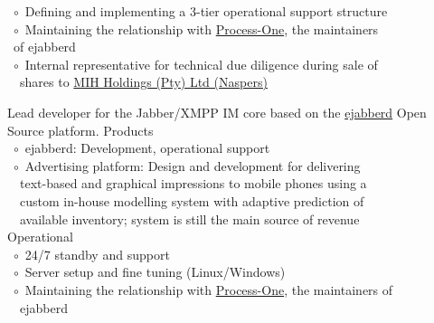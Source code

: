 \documentclass[10pt,a4paper,final]{columncv}
\begin{document}
\begin{cvenv}
{           ~$\circ$~Defining and implementing a 3-tier operational support structure \\
           ~$\circ$~Maintaining the relationship with 
                    \href{http://www.process-one.net/en/}{Process-One}, the maintainers \\ 
           ~\phantom{$\circ$}of ejabberd \\
           ~$\circ$~Internal representative for technical due diligence during sale of \\
           ~\phantom{$\circ$}~shares to \href{http://www.naspers.com/}{MIH Holdings (Pty) Ltd (Naspers)} \\}

         {Lead developer for the Jabber/XMPP IM core based on the 
          \href{http://www.process-one.net/en/ejabberd/}{ejabberd} Open Source platform.}
         {Products \\
          ~$\circ$~ejabberd: Development, operational support \\
          ~$\circ$~Advertising platform: Design and development for delivering \\ 
          ~\phantom{$\circ$}~text-based and graphical impressions to mobile phones using a \\
          ~\phantom{$\circ$}~custom in-house modelling system with adaptive prediction of \\
          ~\phantom{$\circ$}~available inventory; system is still the main source of revenue \\
          Operational \\
          ~$\circ$~24/7 standby and support \\
          ~$\circ$~Server setup and fine tuning (Linux/Windows) \\
          ~$\circ$~Maintaining the relationship with 
                   \href{http://www.process-one.net/en/}{Process-One}, the maintainers of \\ 
          ~\phantom{$\circ$}~ejabberd}
\end{cvenv}

\pagebreak
\end{document}
